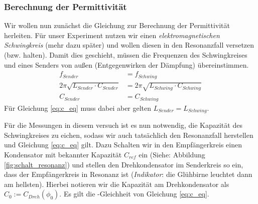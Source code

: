 \documentclass[10pt,a4paper]{article}
\begin{document}
\subsubsection{Berechnung der Permittivität \label{sec:herl}}
\begin{flushleft}
Wir wollen nun zunächst die Gleichung zur Berechnung der Permittivität herleiten. Für unser Experiment nutzen wir einen \textit{elektromagnetischen Schwingkreis} (mehr dazu später) und wollen diesen in den Resonanzfall versetzen (bzw. halten). Damit dies geschieht, müssen die Frequenzen des Schwingkreises und eines Senders von außen (Entgegenwirken der Dämpfung) übereinstimmen.
\begin{align}
f_{Sender} &= f_{Schwing} \label{eq:freq_eq}\\
2 \pi \sqrt{L_{Sender} \cdot C_{Sender}} &= 2 \pi \sqrt{L_{Schwing} \cdot C_{Schwing}} \label{eq:t_eq}\\
C_{Sender} &= C_{Schwing} \label{eq:c_eq}
\end{align}
Für Gleichung \ref{eq:c_eq} muss dabei aber gelten $L_{Sender} = L_{Schwing}$.
\end{flushleft}
\begin{flushleft}
Für die Messungen in diesem versuch ist es nun notwendig, die Kapazität des Schwingkreises zu eichen, sodass wir auch tatsächlich den Resonanzfall herstellen und Gleichung \ref{eq:c_eq} gilt. Dazu Schalten wir in den Empfängerkreis einen Kondensator mit bekannter Kapazität $C_{ref}$ ein (Siehe: Abbildung \ref{fig:schalt_resonanz}) und stellen den Drehkondensator im Senderkreis so ein, dass der Empfängerkreis in Resonanz ist (\textit{Indikator}: die Glühbirne leuchtet dann am hellsten). Hierbei notieren wir die Kapazität am Drehkondensator als $C_0 := C_{Dreh}(\phi_0)$. Es gilt die -Gleichheit von Gleichung \ref{eq:c_eq}.
\end{flushleft}
\end{document}
